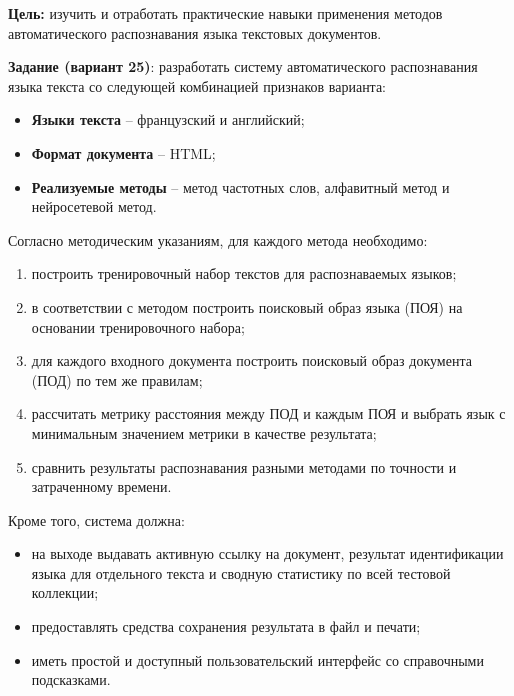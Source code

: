
\textbf{Цель:} изучить и отработать практические навыки применения
методов автоматического распознавания языка текстовых документов.

\vspace{1em}

\textbf{Задание (вариант 25)}: разработать систему автоматического
распознавания языка текста со следующей комбинацией признаков варианта:
\begin{itemize}
  \item \textbf{Языки текста} -- французский и английский;
  \item \textbf{Формат документа} -- HTML;
  \item \textbf{Реализуемые методы} -- метод частотных слов, алфавитный
  метод и нейросетевой метод.
\end{itemize}

\vspace{1em}

Согласно методическим указаниям, для каждого метода необходимо:
\begin{enumerate}
  \item построить тренировочный набор текстов для распознаваемых языков;
  \item в соответствии с методом построить поисковый образ языка (ПОЯ)
  на основании тренировочного набора;
  \item для каждого входного документа построить поисковый образ
  документа (ПОД) по тем же правилам;
  \item рассчитать метрику расстояния между ПОД и каждым ПОЯ и выбрать
  язык с минимальным значением метрики в качестве результата;
  \item сравнить результаты распознавания разными методами по точности
  и затраченному времени.
\end{enumerate}

Кроме того, система должна:
\begin{itemize}
  \item на выходе выдавать активную ссылку на документ, результат
  идентификации языка для отдельного текста и сводную статистику по
  всей тестовой коллекции;
  \item предоставлять средства сохранения результата в файл и печати;
  \item иметь простой и доступный пользовательский интерфейс со
  справочными подсказками.
\end{itemize}
